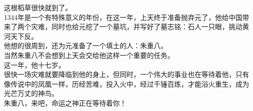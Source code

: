 \begin{multicols}{\theparacolNo}
这根稻草很快就到了。\\

1344年是一个有特殊意义的年份，在这一年，上天终于准备抛弃元了，他给中国带来了两个灾难，同时也给元挖了一个墓坑，并写好了墓志铭：石人一只眼，挑动黄河天下反。\\

他想的很周到，还为元准备了一个填土的人：朱重八。\\

当然朱重八不会想到上天会交给他这样一个重要的任务。\\

这一年，他十七岁。\\

很快一场灾难就要降临到他的身上，但同时，一个伟大的事业也在等待着他，只有像传说中的凤凰一样，历经苦难，投入火中，经过千锤百炼，才能浴火重生，成为光芒万丈的神鸟。\\

朱重八，来吧，命运之神正在等待着你！\\
\ifnum{}
	\end{multicols}
\fi
\newpage

